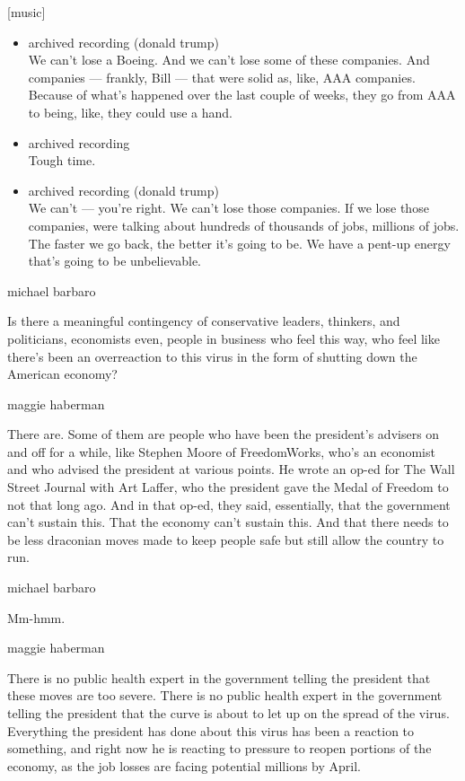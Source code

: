 {[}music{]}

\begin{itemize}
\item
  archived recording (donald trump)\\
  We can't lose a Boeing. And we can't lose some of these companies. And
  companies --- frankly, Bill --- that were solid as, like, AAA
  companies. Because of what's happened over the last couple of weeks,
  they go from AAA to being, like, they could use a hand.
\item
  archived recording\\
  Tough time.
\item
  archived recording (donald trump)\\
  We can't --- you're right. We can't lose those companies. If we lose
  those companies, were talking about hundreds of thousands of jobs,
  millions of jobs. The faster we go back, the better it's going to be.
  We have a pent-up energy that's going to be unbelievable.
\end{itemize}

michael barbaro

Is there a meaningful contingency of conservative leaders, thinkers, and
politicians, economists even, people in business who feel this way, who
feel like there's been an overreaction to this virus in the form of
shutting down the American economy?

maggie haberman

There are. Some of them are people who have been the president's
advisers on and off for a while, like Stephen Moore of FreedomWorks,
who's an economist and who advised the president at various points. He
wrote an op-ed for The Wall Street Journal with Art Laffer, who the
president gave the Medal of Freedom to not that long ago. And in that
op-ed, they said, essentially, that the government can't sustain this.
That the economy can't sustain this. And that there needs to be less
draconian moves made to keep people safe but still allow the country to
run.

michael barbaro

Mm-hmm.

maggie haberman

There is no public health expert in the government telling the president
that these moves are too severe. There is no public health expert in the
government telling the president that the curve is about to let up on
the spread of the virus. Everything the president has done about this
virus has been a reaction to something, and right now he is reacting to
pressure to reopen portions of the economy, as the job losses are facing
potential millions by April.

